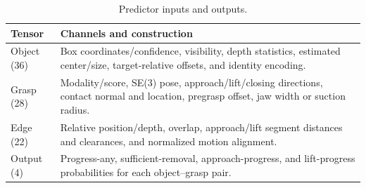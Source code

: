 \begin{table}[htbp]
\centering\small
\caption{Predictor inputs and outputs.}
\label{tab:input_output}
\begin{tabular}{@{}p{.19\linewidth}p{.72\linewidth}@{}}\toprule
Tensor & Channels and construction \\\midrule
    Object (36) & Box coordinates/confidence, visibility, depth statistics, estimated center/size, target-relative offsets, and identity encoding. \\
    Grasp (28) & Modality/score, SE(3) pose, approach/lift/closing directions, contact normal and location, pregrasp offset, jaw width or suction radius. \\
    Edge (22) & Relative position/depth, overlap, approach/lift segment distances and clearances, and normalized motion alignment. \\
    Output (4) & Progress-any, sufficient-removal, approach-progress, and lift-progress probabilities for each object--grasp pair. \\
    \bottomrule
\end{tabular}
\end{table}